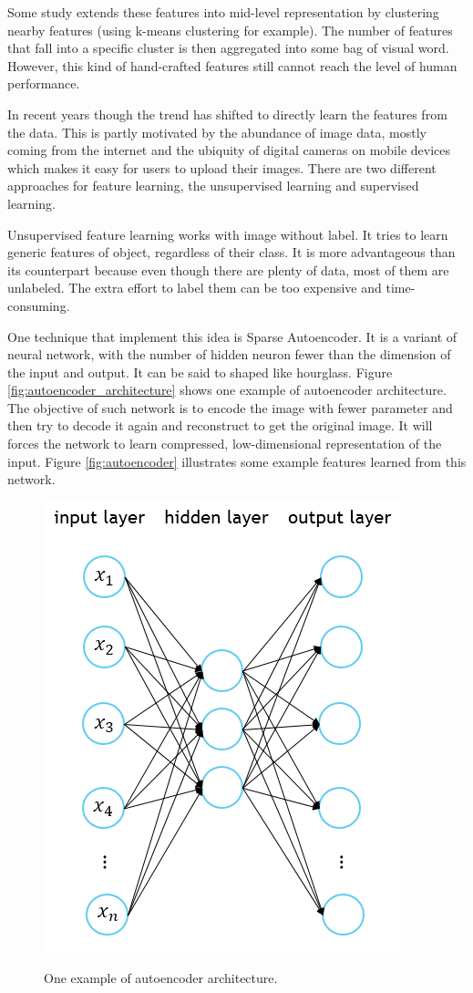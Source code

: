 \documentclass[a4paper,11pt]{kth-mag}
\begin{document}
Some study extends these features into mid-level representation by clustering nearby features (using k-means clustering for example). The number of features that fall into a specific cluster is then aggregated into some bag of visual word. However, this kind of hand-crafted features still cannot reach the level of human performance.

In recent years though the trend has shifted to directly learn the features from the data. This is partly motivated by the abundance of image data, mostly coming from the internet and the ubiquity of digital cameras on mobile devices which makes it easy for users to upload their images. There are two different approaches for feature learning, the unsupervised learning and supervised learning.

Unsupervised feature learning works with image without label. It tries to learn generic features of object, regardless of their class. It is more advantageous than its counterpart because even though there are plenty of data, most of them are unlabeled. The extra effort to label them can be too expensive and time-consuming.

One technique that implement this idea is Sparse Autoencoder. It is a variant of neural network, with the number of hidden neuron fewer than the dimension of the input and output. It can be said to shaped like hourglass. Figure \ref{fig:autoencoder_architecture} shows one example of autoencoder architecture. The objective of such network is to encode the image with fewer parameter and then try to decode it again and reconstruct to get the original image. It will forces the network to learn compressed, low-dimensional representation of the input. Figure \ref{fig:autoencoder} illustrates some example features learned from this network.

\begin{figure}[h]
\centering
\includegraphics[scale=0.5]{image/autoencoder_architecture.png}
\label{fig:autoencoder_architecture.png}
\caption{One example of autoencoder architecture.}
\end{figure}
\end{document}
